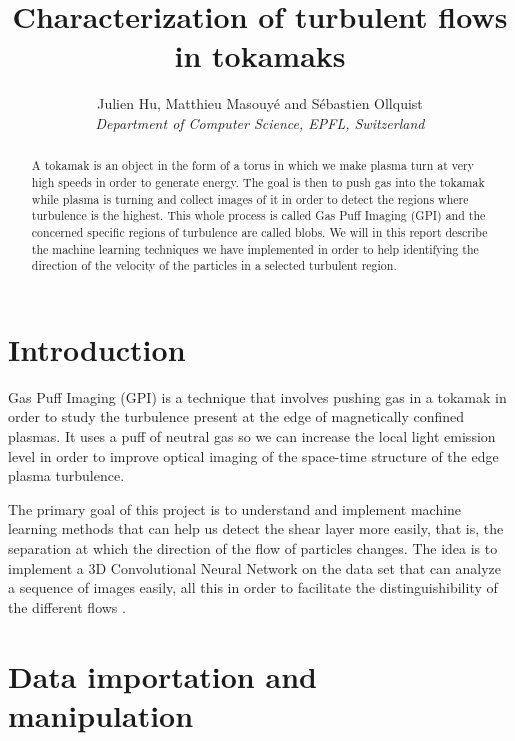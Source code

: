 \documentclass[10pt,conference,compsocconf]{IEEEtran}
\begin{document}
\title{Characterization of turbulent flows in tokamaks}

\author{
  Julien Hu, Matthieu Masouyé and Sébastien Ollquist\\
  \textit{Department of Computer Science, EPFL, Switzerland}
}

\maketitle

\begin{abstract}
  A tokamak is an object in the form of a torus in which we make plasma turn at very high speeds in order to generate energy. The goal is then to push gas into the tokamak while plasma is turning and collect images of it in order to detect the regions where turbulence is the highest. This whole process is called Gas Puff Imaging (GPI) and the concerned specific regions of turbulence are called blobs. We will in this report describe the machine learning techniques we have implemented in order to help identifying the direction of the velocity of the particles in a selected turbulent region.
\end{abstract}

\section{Introduction}
Gas Puff Imaging (GPI) is a technique that involves pushing gas in a tokamak in order to study the turbulence present at the edge of magnetically confined plasmas. It uses a puff of neutral gas so we can increase the local light emission level in order to improve optical imaging of the space-time structure of the edge plasma turbulence.\par
The primary goal of this project is to understand and implement machine learning methods that can help us detect the shear layer more easily, that is, the separation at which the direction of the flow of particles changes. The idea is to implement a 3D Convolutional Neural Network on the data set that can analyze a sequence of images easily, all this in order to facilitate the distinguishibility of the different flows \cite{velocitycnn}.

\section{Data importation and manipulation}
\end{document}
